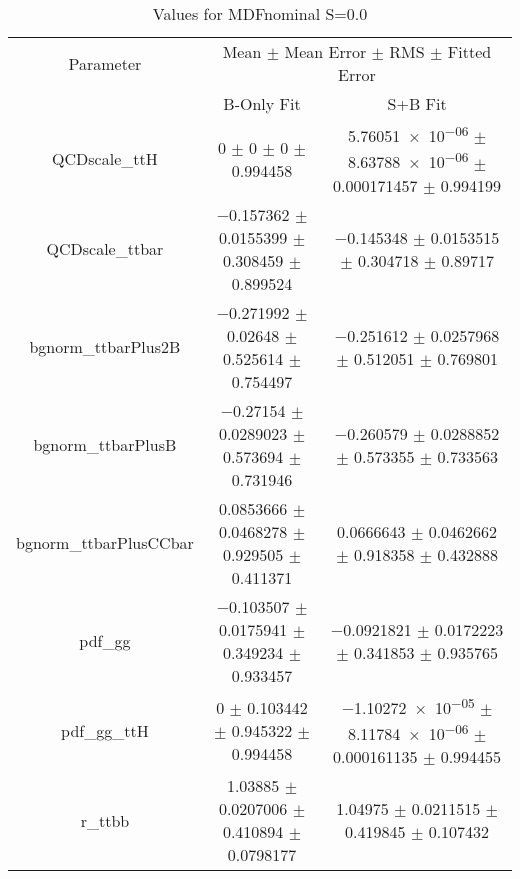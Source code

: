 \begin{table}
\centering
\caption{Values for MDFnominal S=0.0}
\begin{tabular}{ccc}
\toprule
Parameter & \multicolumn{2}{c}{Mean $\pm$ Mean Error $\pm$ RMS $\pm$ Fitted Error}\\
 & B-Only Fit & S+B Fit\\
\midrule
QCDscale\_ttH & \num{0} $\pm$ \num{0} $\pm$ \num{0} $\pm$ \num{0.994458} & \num{5.76051e-06} $\pm$ \num{8.63788e-06} $\pm$ \num{0.000171457} $\pm$ \num{0.994199}\\
QCDscale\_ttbar & \num{-0.157362} $\pm$ \num{0.0155399} $\pm$ \num{0.308459} $\pm$ \num{0.899524} & \num{-0.145348} $\pm$ \num{0.0153515} $\pm$ \num{0.304718} $\pm$ \num{0.89717}\\
bgnorm\_ttbarPlus2B & \num{-0.271992} $\pm$ \num{0.02648} $\pm$ \num{0.525614} $\pm$ \num{0.754497} & \num{-0.251612} $\pm$ \num{0.0257968} $\pm$ \num{0.512051} $\pm$ \num{0.769801}\\
bgnorm\_ttbarPlusB & \num{-0.27154} $\pm$ \num{0.0289023} $\pm$ \num{0.573694} $\pm$ \num{0.731946} & \num{-0.260579} $\pm$ \num{0.0288852} $\pm$ \num{0.573355} $\pm$ \num{0.733563}\\
bgnorm\_ttbarPlusCCbar & \num{0.0853666} $\pm$ \num{0.0468278} $\pm$ \num{0.929505} $\pm$ \num{0.411371} & \num{0.0666643} $\pm$ \num{0.0462662} $\pm$ \num{0.918358} $\pm$ \num{0.432888}\\
pdf\_gg & \num{-0.103507} $\pm$ \num{0.0175941} $\pm$ \num{0.349234} $\pm$ \num{0.933457} & \num{-0.0921821} $\pm$ \num{0.0172223} $\pm$ \num{0.341853} $\pm$ \num{0.935765}\\
pdf\_gg\_ttH & \num{0} $\pm$ \num{0.103442} $\pm$ \num{0.945322} $\pm$ \num{0.994458} & \num{-1.10272e-05} $\pm$ \num{8.11784e-06} $\pm$ \num{0.000161135} $\pm$ \num{0.994455}\\
r\_ttbb & \num{1.03885} $\pm$ \num{0.0207006} $\pm$ \num{0.410894} $\pm$ \num{0.0798177} & \num{1.04975} $\pm$ \num{0.0211515} $\pm$ \num{0.419845} $\pm$ \num{0.107432}\\
\bottomrule
\end{tabular}
\end{table}